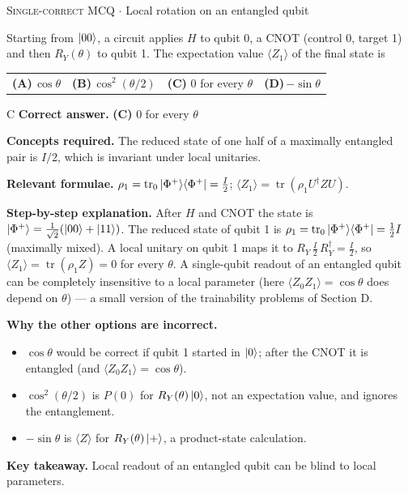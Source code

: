 \documentclass[11pt,a4paper]{article}
\newcommand{\optlabel}[1]{\textbf{(#1)}}
\newcommand{\correctlabel}[1]{\textcolor{okgreen}{\textbf{(#1)}\,\ding{51}}}
\newenvironment{qitem}[1]{\begin{list}{}{\setlength{\leftmargin}{3.3em}\setlength{\labelwidth}{3.1em}%
  \setlength{\labelsep}{0.2em}\setlength{\topsep}{3pt}\setlength{\parsep}{3pt}}\item[\textbf{Q.#1}\hfill]}{\end{list}}
\newcommand{\qsep}{\par\vspace{2pt}{\color{black!15}\hrule}\vspace{4pt}}
\newcommand{\qmeta}[2]{{\footnotesize\color{black!60}\textsc{#1} \;$\cdot$\; #2}\par}
\begin{document}
\begin{qitem}{26}
\qmeta{Single-correct MCQ}{Local rotation on an entangled qubit}
Starting from $\ket{00}$, a circuit applies $H$ to qubit 0, a CNOT (control 0, target 1) and then $R_Y(\theta)$ to
qubit 1. The expectation value $\langle Z_1\rangle$ of the final state is
\par\smallskip\noindent\begin{tabularx}{\linewidth}{@{}*{4}{L}@{}}
\optlabel{A}\,$\cos\theta$ & \optlabel{B}\,$\cos^2(\theta/2)$ & \correctlabel{C}\,$0$ for every $\theta$ & \optlabel{D}\,$-\sin\theta$
\end{tabularx}
\end{qitem}
\begin{solbox}{C}
\textbf{\color{brand}Correct answer.} \textcolor{okgreen}{\textbf{(C)}} $0$ for every $\theta$

\textbf{\color{brand}Concepts required.} The reduced state of one half of a maximally entangled pair is $I/2$, which is invariant under local unitaries.

\textbf{\color{brand}Relevant formulae.} $\rho_1 = \operatorname{tr}_0\ket{\Phi^+}\!\bra{\Phi^+} = \frac I2$; $\langle Z_1\rangle = \operatorname{tr}(\rho_1U^\dagger ZU)$.

\textbf{\color{brand}Step-by-step explanation.} After $H$ and CNOT the state is $\ket{\Phi^+} = \frac{1}{\sqrt2}(\ket{00} + \ket{11})$. The reduced state of qubit 1 is
$\rho_1 = \operatorname{tr}_0\ket{\Phi^+}\!\bra{\Phi^+} = \frac12 I$ (maximally mixed). A local unitary on qubit 1 maps it to
$R_Y\,\frac I2\,R_Y^\dagger = \frac I2$, so $\langle Z_1\rangle = \operatorname{tr}(\rho_1 Z) = 0$ for every $\theta$.
A single-qubit readout of an entangled qubit can be completely insensitive to a local parameter
(here $\langle Z_0Z_1\rangle = \cos\theta$ does depend on $\theta$) --- a small version of the trainability problems of Section D.

\textbf{\color{brand}Why the other options are incorrect.}
\begin{itemize}[leftmargin=2.4em, itemsep=1pt, topsep=2pt]
\item[\textbf{(A)}] $\cos\theta$ would be correct if qubit 1 started in $\ket0$; after the CNOT it is entangled (and $\langle Z_0Z_1\rangle = \cos\theta$).
\item[\textbf{(B)}] $\cos^2(\theta/2)$ is $P(0)$ for $R_Y(\theta)\ket0$, not an expectation value, and ignores the entanglement.
\item[\textbf{(D)}] $-\sin\theta$ is $\langle Z\rangle$ for $R_Y(\theta)\ket+$, a product-state calculation.
\end{itemize}
\textbf{\color{brand}Key takeaway.} Local readout of an entangled qubit can be blind to local parameters.
\end{solbox}
\qsep
\end{document}
